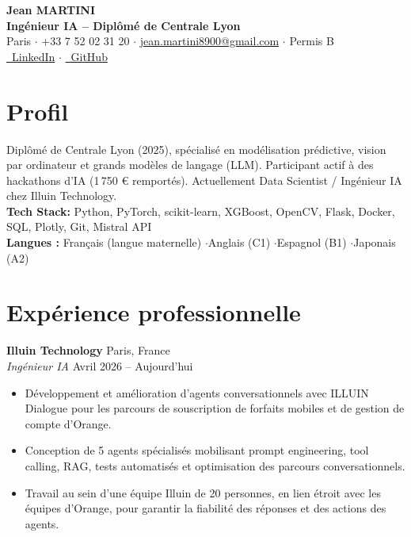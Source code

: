 \documentclass[10pt, a4paper]{article}
\begin{document}
\begin{center}
    {\Huge \bfseries \color{primary} Jean MARTINI}\\[4pt]
    {\large \bfseries Ingénieur IA -- Diplômé de Centrale Lyon}\\[6pt]
    \small
    Paris \quad$\cdot$\quad 
    +33 7 52 02 31 20 \quad$\cdot$\quad 
    \href{mailto:jean.martini8900@gmail.com}{jean.martini8900@gmail.com} \quad$\cdot$\quad 
    Permis B\\[2pt]
    \href{https://linkedin.com/in/jean-martini-64a017228/}{\faLinkedin\ LinkedIn} \quad$\cdot$\quad 
    \href{https://github.com/Jean8900}{\faGithub\ GitHub}
\end{center}

\section{Profil}
Diplômé de Centrale Lyon (2025), spécialisé en modélisation prédictive, vision par ordinateur et grands modèles de langage (LLM). Participant actif à des hackathons d'IA (1\,750 € remportés). Actuellement Data Scientist / Ingénieur IA chez Illuin Technology.\\[3pt]
\textbf{Tech Stack:} Python, PyTorch, scikit-learn, XGBoost, OpenCV, Flask, Docker, SQL, Plotly, Git, Mistral API\\
\textbf{Langues :} Français (langue maternelle) \quad$\cdot$\quad Anglais (C1) \quad$\cdot$\quad Espagnol (B1) \quad$\cdot$\quad Japonais (A2)

\section{Expérience professionnelle}

\textbf{Illuin Technology} \hfill Paris, France\\
\textit{Ingénieur IA} \hfill \small Avril 2026 -- Aujourd'hui
\begin{itemize}
    \item Développement et amélioration d'agents conversationnels avec ILLUIN Dialogue pour les parcours de souscription de forfaits mobiles et de gestion de compte d'Orange.
    \item Conception de 5 agents spécialisés mobilisant prompt engineering, tool calling, RAG, tests automatisés et optimisation des parcours conversationnels.
    \item Travail au sein d'une équipe Illuin de 20 personnes, en lien étroit avec les équipes d'Orange, pour garantir la fiabilité des réponses et des actions des agents.
\end{itemize}
\end{document}
